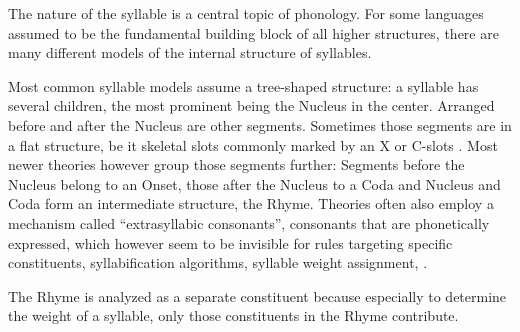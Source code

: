 \begin{deleted}\small
{}

\end{deleted}\par\bigskip

The nature of the syllable is a central topic of phonology.
For some languages assumed to be the
fundamental building block of all higher structures,
there are many different models of the internal structure
of syllables.

Most common syllable models assume a tree-shaped structure:
a syllable has several children, the most prominent being
the Nucleus in the center. Arranged before and after the Nucleus
are other segments. Sometimes those segments are 
in a flat structure, be it
skeletal slots commonly marked by an X 
or C-slots \parencite{clements1983}.
Most newer theories however group those segments further:
Segments before the Nucleus belong to an Onset, those after
the Nucleus to a Coda and Nucleus and Coda form an intermediate
structure, the Rhyme. Theories often also employ a mechanism
called \enquote{extrasyllabic consonants}, consonants that
are phonetically expressed, which however seem to be invisible
for rules targeting specific constituents, syllabification
algorithms, syllable weight assignment, \textellipsis{}.

\begin{deleted}
The Rhyme is analyzed as a separate constituent
because especially to determine the weight of a syllable,
only those constituents in the Rhyme contribute.
\end{deleted}

